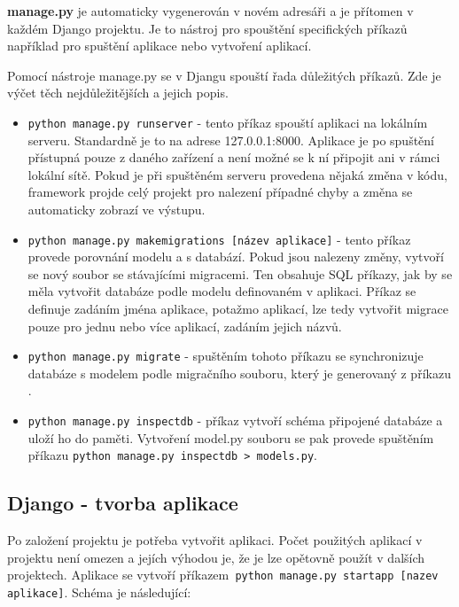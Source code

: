 \textbf{manage.py} je automaticky vygenerován v novém adresáři a je
přítomen v každém Django projektu. Je to nástroj pro spouštění
specifických příkazů například pro spuštění aplikace nebo vytvoření
aplikací.

\newpage

Pomocí nástroje manage.py se v Djangu spouští řada důležitých
příkazů. Zde je výčet těch nejdůležitějších a jejich popis. \cite{django-admin-manage}

\begin{itemize}
\item {\tt python manage.py runserver} - tento příkaz spouští
  aplikaci na lokálním serveru. Standardně je to na adrese
  127.0.0.1:8000. Aplikace je po spuštění přístupná pouze z daného
  zařízení a není možné se k ní připojit ani v rámci lokální
  sítě. Pokud je při spuštěném serveru provedena nějaká změna v kódu,
  framework projde celý projekt pro nalezení případné chyby a změna se
  automaticky zobrazí ve výstupu.
	
\item {\tt python manage.py makemigrations [název aplikace]} -
  tento příkaz provede porovnání modelu a s databází. Pokud jsou
  nalezeny změny, vytvoří se nový soubor se stávajícími migracemi. Ten
  obsahuje SQL příkazy, jak by se měla vytvořit databáze podle modelu
  definovaném v aplikaci. Příkaz se definuje zadáním jména aplikace,
  potažmo aplikací, lze tedy vytvořit migrace pouze pro jednu nebo
  více aplikací, zadáním jejich názvů.

\item {\tt python manage.py migrate} - spuštěním tohoto příkazu se
  synchronizuje databáze s modelem podle migračního souboru, který je
  generovaný z příkazu .
	
\item {\tt python manage.py inspectdb} - příkaz vytvoří schéma
  připojené databáze a uloží ho do paměti. Vytvoření model.py souboru
  se pak provede spuštěním příkazu {\tt python manage.py inspectdb
    > models.py}.

\end{itemize}

\newpage

\subsection{Django - tvorba aplikace}

Po založení projektu je potřeba vytvořit aplikaci. Počet použitých
aplikací v projektu není omezen a jejích výhodou je, že je lze
opětovně použít v dalších projektech. Aplikace se vytvoří příkazem{\tt
python manage.py startapp [nazev aplikace]}. \cite{django-init} Schéma je následující:

